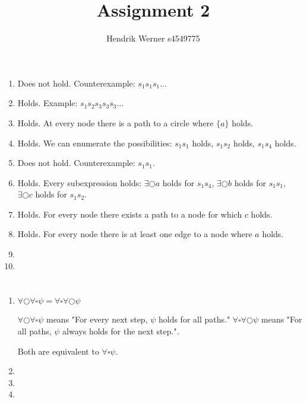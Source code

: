 \documentclass[12pt, a4paper]{article}
\title{Assignment 2}
\author{Hendrik Werner s4549775}
\begin{document}
\maketitle

\section{} %
\begin{enumerate}[a]
	\item %
	Does not hold. Counterexample: $s_1 s_1 s_1 \dots$
	\item %
	Holds. Example: $s_1 s_2 s_3 s_3 s_3 \dots$
	\item %
	Holds. At every node there is a path to a circle where $\{a\}$ holds.
	\item %
	Holds. We can enumerate the possibilities: $s_1 s_1$ holds, $s_1 s_2$ holds, $s_1 s_4$ holds.
	\item %
	Does not hold. Counterexample: $s_1 s_1$.
	\item %
	Holds. Every subexpression holds: $\exists \bigcirc a$ holds for $s_1 s_4$, $\exists \bigcirc b$ holds for $s_1 s_1$, $\exists \bigcirc c$ holds for $s_1 s_2$.
	\item %
	Holds. For every node there exists a path to a node for which $c$ holds.
	\item %
	Holds. For every node there is at least one edge to a node where $a$ holds.
	\item %
	\item %
\end{enumerate}

\section{} %
\begin{enumerate}[a]
	\item %
	$\forall \bigcirc \forall \square \psi = \forall \square \forall \bigcirc \psi$

	$\forall \bigcirc \forall \square \psi$ means "For every next step, $\psi$ holds for all paths." $\forall \square \forall \bigcirc \psi$ means "For all paths, $\psi$ always holds for the next step.".

	Both are equivalent to $\forall \square \psi$.
	\item %
	\item %
	\item %
\end{enumerate}
\end{document}
